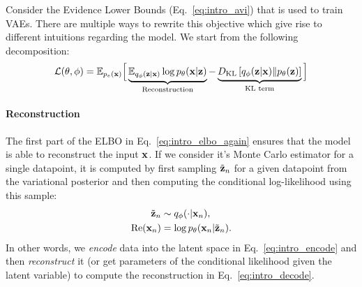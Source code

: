 Consider the Evidence Lower Bounds (Eq.~\ref{eq:intro_avi}) that is used to train VAEs. There are multiple ways to rewrite this objective which give rise to different intuitions regarding the model. We start from the following decomposition:
\begin{equation}\label{eq:intro_elbo_again}
\mathcal{L}(\theta, \phi) = \E_{p_e(\rvx)}\Big[ \underbrace{\E_{q_{\phi}(\rvz|\rvx)} \log p_{\theta}(\rvx| \rvz)}_{\text{Reconstruction}} - \underbrace{\KL{q_{\phi}(\rvz|\rvx)}{p_{\theta}(\rvz)}}_{\text{KL term}} \Big]%
\end{equation}

\paragraph{Reconstruction}
The first part of the ELBO in Eq.~\ref{eq:intro_elbo_again} ensures that the model is able to reconstruct the input ${\mathbf{x}}$. If we consider it's Monte Carlo estimator for a single datapoint, it is computed by first sampling $\tilde{{\mathbf{z}}}_n$ for a given datapoint from the variational posterior
and then computing the conditional log-likelihood using this sample:
\begin{align}
    \tilde{\rvz}_n &\sim q_{\phi}(\cdot|\rvx_n), \label{eq:intro_encode}\\
    \text{Re}(\rvx_n) &= \log p_{\theta}(\rvx_n|\tilde{\rvz}_n).\label{eq:intro_decode}
\end{align}
In other words, we \textit{encode} data into the latent space in Eq.~\ref{eq:intro_encode} and then \textit{reconstruct} it (or get parameters of the conditional likelihood given the latent variable) to compute the reconstruction in Eq.~\ref{eq:intro_decode}.

